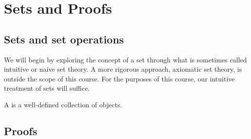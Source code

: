\chapter{Sets and Proofs}

\section{Sets and set operations}

We will begin by exploring the concept of a set through what is sometimes called intuitive or naive set theory. A more rigorous approach, axiomatic set theory, is outside the scope of this course. For the purposes of this course, our intuitive treatment of sets will suffice.

\begin{defn}
A  is a well-defined collection of objects.
\end{defn}

\section{Proofs}